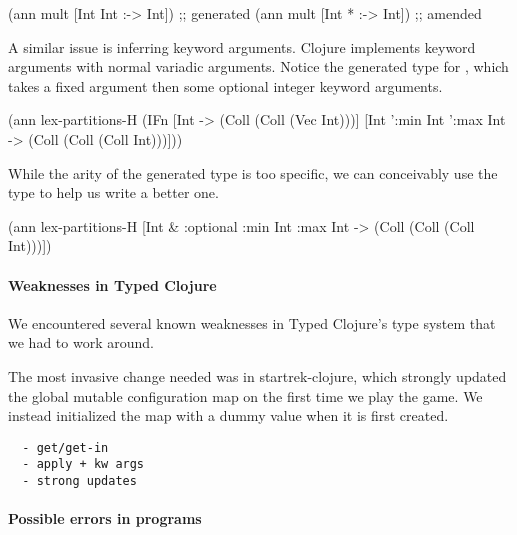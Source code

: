 \begin{cljlisting}
(ann mult [Int Int :-> Int]) ;; generated
(ann mult [Int * :-> Int])   ;; amended
\end{cljlisting}

A similar issue is inferring keyword arguments. Clojure implements
keyword arguments with normal variadic arguments. Notice
the generated type for ,
which takes a fixed argument then some optional integer keyword
arguments. 

\begin{cljlisting}
(ann lex-partitions-H
	(IFn [Int -> (Coll (Coll (Vec Int)))]
		   [Int ':min Int ':max Int 
        -> (Coll (Coll (Coll Int)))]))
\end{cljlisting}

While the arity of the generated type is too specific,
we can conceivably use the type to help us write a better one.

\begin{cljlisting}
(ann lex-partitions-H
  [Int & :optional {:min Int :max Int}
   -> (Coll (Coll (Coll Int)))])
\end{cljlisting}

\paragraph{Weaknesses in Typed Clojure}

We encountered several known weaknesses in Typed Clojure's type system
that we had to work around.

The most invasive change needed was in startrek-clojure, which
strongly updated the global mutable configuration map on the first
time we play the game. We instead initialized the map with a dummy
value when it is first created.

\begin{verbatim}
  - get/get-in
  - apply + kw args
  - strong updates
\end{verbatim}

\paragraph{Possible errors in programs}

